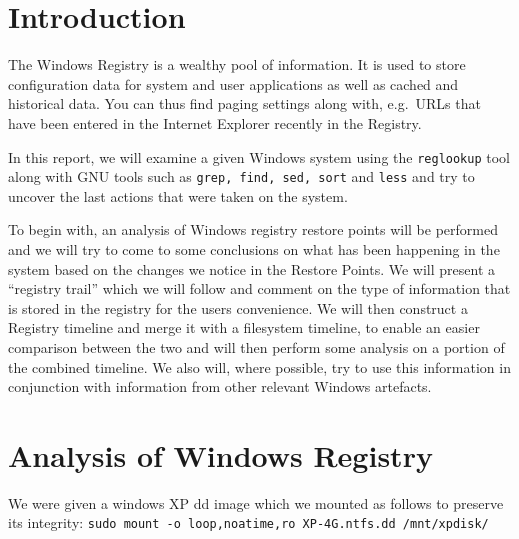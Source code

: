 \documentclass[a4paper,
    11pt,
    normalheadings,
    parindent,
    UKenglish,
    abstracton,
    ]{scrartcl}
\title{\mytitle{}}
\author{
    cand. Dipl. Inf. Tobias Müller <\href{mailto:muellet2@computing.dcu.ie?subject=ss10-forensic-lab01}{muellet2@}>, 59212333 \and
    BSc. Anthony Walters <\href{mailto:waltera3@computing.dcu.ie?subject=ss10-forensic-lab01}{waltera3@}>, 59213102
    }
\date{\today}
\begin{document}
\maketitle


\section{Introduction}
The Windows Registry is a wealthy pool of information.
It is used to store configuration data for system and user applications as well as cached and historical data.
You can thus find paging settings along with, e.g.\, URLs that have been entered in the Internet Explorer recently in the Registry.


In this report, we will examine a given Windows system using the \texttt{reglookup} tool along with GNU tools such as \texttt{grep, find, sed, sort} and \texttt{less} and try to uncover the last actions that were taken on the system.

To begin with, an analysis of Windows registry restore points will be performed and we will try to come to some conclusions on what has been happening  in the system based on the changes we notice in the Restore Points.
We will present a ``registry trail'' which we will follow and comment on the type of information that is stored in the registry for the users convenience.
We will then construct a Registry timeline and merge it with a filesystem timeline, to enable an easier comparison between the two and will then perform some analysis on a portion of the combined timeline.
We also will, where possible, try to use this information in conjunction with information from other relevant Windows artefacts.


\section{Analysis of Windows Registry}
We were given a windows XP dd image which we mounted as follows to preserve its integrity: \verb|sudo mount -o loop,noatime,ro XP-4G.ntfs.dd /mnt/xpdisk/|
\end{document}

